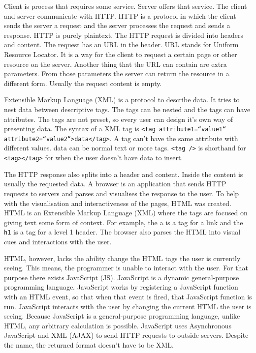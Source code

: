 Client is process that requires some service. Server offers that service. The client and server communicate with HTTP. HTTP is a protocol in which the client sends the server a request and the server processes the request and sends a response. HTTP is purely plaintext. The HTTP request is divided into headers and content. The request has an URL in the header. URL stands for Uniform Resource Locator. It is a way for the client to request a certain page or other resource on the server. Another thing that the URL can contain are extra parameters. From those parameters the server can return the resource in a different form. Usually the request content is empty.

Extensible Markup Language (XML) is a protocol to describe data. It tries to nest data between descriptive tags. The tags can be nested and the tags can have attributes. The tags are not preset, so every user can design it's own way of presenting data. The syntax of a XML tag is \texttt{<tag attribute1=“value1“ attribute2=“value2“>data</tag>}. A tag can't have the same attribute with different values. data can be normal text or more tags. \texttt{<tag />} is shorthand for \texttt{<tag></tag>} for when the user doesn't have data to insert.

The HTTP response also splits into a header and content. Inside the content is
usually the requested data. A browser is an application that sends HTTP requests
to servers and parses and visualises the response to the user. To help with the
visualisation and interactiveness of the pages, HTML was created. HTML is an
Extensible Markup Language (XML) where the tags are focused on giving text some
form of context. For example, the a is a tag for a link and the \texttt{h1} is a
tag for a level 1 header. The browser also parses the HTML into visual cues and
interactions with the user.

HTML, however, lacks the ability change the HTML tags the user is currently
seeing. This means, the programmer is unable to interact with the user. For that
purpose there exists JavaScript (JS). JavaScript is a dynamic general-purpose
programming language. JavaScript works by registering a JavaScript function with an HTML
event, so that when that event is fired, that JavaScript function is run.
JavaScript interacts with the user by changing the current HTML the user is
seeing. Because JavaScript is a general-purpose programming language, unlike
HTML, any arbitrary calculation is possible. JavaScript uses Asynchronous
JavaScript and XML (AJAX) to send HTTP requests to outside servers. Despite the
name, the returned format doesn't have to be XML.

